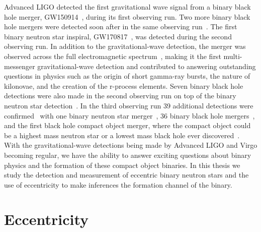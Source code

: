 Advanced LIGO detected the first gravitational wave signal from a binary black hole merger, GW150914~\cite{Abbott:2016blz}, during its first observing run. Two more binary black hole mergers were detected soon after in the same observing run~\cite{TheLIGOScientific:2016pea, Nitz:2018imz}. The first binary neutron star inspiral, GW170817~\cite{TheLIGOScientific:2017qsa}, was detected during the second observing run. In addition to the gravitational-wave detection, the merger was observed across the full electromagnetic spectrum~\cite{GBM:2017lvd}, making it the first multi-messenger gravitational-wave detection and contributed to answering outstanding questions in physics such as the origin of short gamma-ray bursts, the nature of kilonovae, and the creation of the r-process elements. Seven binary black hole detections were also made in the second observing run on top of the binary neutron star detection~\cite{Abbott:2017gyy,Abbott:2017oio,Abbott:2017vtc,LIGOScientific:2018mvr}. In the third observing run 39 additional detections were confirmed~\cite{Abbott:2020niy} with one binary neutron star merger~\cite{Abbott:2020uma}, 36 binary black hole mergers~\cite{Abbott:2020niy,Abbott:2020tfl,LIGOScientific:2020stg}, and the first black hole compact object merger, where the compact object could be a highest mass neutron star or a lowest mass black hole ever discovered~\cite{Abbott:2020khf}. With the gravitational-wave detections being made by Advanced LIGO and Virgo becoming regular, we have the ability to answer exciting questions about binary physics and the formation of these compact object binaries. In this thesis we study the detection and measurement of eccentric binary neutron stars and the use of eccentricity to make inferences the formation channel of the binary.

\section{Eccentricity}

